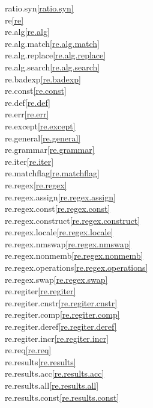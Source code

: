 \begin{multicols}{2}
ratio.syn\quad\ref{ratio.syn}\\
re\quad\ref{re}\\
re.alg\quad\ref{re.alg}\\
re.alg.match\quad\ref{re.alg.match}\\
re.alg.replace\quad\ref{re.alg.replace}\\
re.alg.search\quad\ref{re.alg.search}\\
re.badexp\quad\ref{re.badexp}\\
re.const\quad\ref{re.const}\\
re.def\quad\ref{re.def}\\
re.err\quad\ref{re.err}\\
re.except\quad\ref{re.except}\\
re.general\quad\ref{re.general}\\
re.grammar\quad\ref{re.grammar}\\
re.iter\quad\ref{re.iter}\\
re.matchflag\quad\ref{re.matchflag}\\
re.regex\quad\ref{re.regex}\\
re.regex.assign\quad\ref{re.regex.assign}\\
re.regex.const\quad\ref{re.regex.const}\\
re.regex.construct\quad\ref{re.regex.construct}\\
re.regex.locale\quad\ref{re.regex.locale}\\
re.regex.nmswap\quad\ref{re.regex.nmswap}\\
re.regex.nonmemb\quad\ref{re.regex.nonmemb}\\
re.regex.operations\quad\ref{re.regex.operations}\\
re.regex.swap\quad\ref{re.regex.swap}\\
re.regiter\quad\ref{re.regiter}\\
re.regiter.cnstr\quad\ref{re.regiter.cnstr}\\
re.regiter.comp\quad\ref{re.regiter.comp}\\
re.regiter.deref\quad\ref{re.regiter.deref}\\
re.regiter.incr\quad\ref{re.regiter.incr}\\
re.req\quad\ref{re.req}\\
re.results\quad\ref{re.results}\\
re.results.acc\quad\ref{re.results.acc}\\
re.results.all\quad\ref{re.results.all}\\
re.results.const\quad\ref{re.results.const}\\

\end{multicols}
